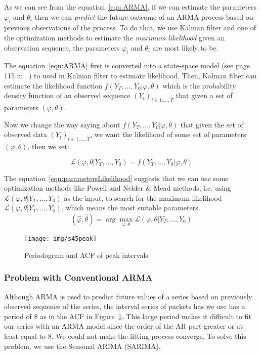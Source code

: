 \documentclass[12pt]{article}
\begin{document}
As we can see from the equation~\ref{eqn:ARMA}, if we can estimate the
parameters $\varphi_i$ and $\theta_i$ then we can \textit{predict} the future
outcome of an ARMA process based on previous observations of the process. To do
that, we use Kalman filter and one of the optimization methods to estimate the
\textit{maximum likelihood} given an observation sequence, the parameters
$\varphi_i$ and $\theta_i$ are most likely to be.

The equation~\ref{eqn:ARMA} first is converted into a state-space model (see
page 115 in~\cite{FalkStatSAS} ) to used in Kalman filter to estimate
likelihood. Then, Kalman filter can estimate the likelihood function
$f(Y_T,\ldots, Y_0|\varphi, \theta)$ which is the probability density
function of an observed sequence $(Y_t)_{t\in 1, \ldots, T}$ that given a set of
parameters $(\varphi, \theta)$.

Now we change the way saying about $f(Y_T,\ldots,Y_0|\varphi, \theta)$ that
given the set of observed data $(Y_t)_{t\in 1, \ldots, T}$, we want the likelihood of
some set of parameters $(\varphi, \theta)$, then we set:

\begin{equation}\label{eqn:parametersLikelihood}
\mathcal{L}(\varphi, \theta|Y_T,\ldots, Y_0) = f(Y_T,\ldots,Y_0|\varphi,
\theta)
\end{equation}

The equation~\ref{eqn:parametersLikelihood} suggests that we can use some
optimization methods like Powell and Nelder \& Mead methods, i.e. using
$\mathcal{L}(\varphi, \theta|Y_T,\ldots, Y_0)$ as the input, to search for the
maximum likelihood $\mathcal{L}(\varphi, \theta|Y_T,\ldots, Y_0)$, which means
the most suitable parameters.
\begin{equation}
(\hat{\varphi},\hat{\theta})=\arg\max_{\varphi, \theta} \mathcal{L}(\varphi,
\theta|Y_T,\ldots, Y_0)
\end{equation}

\begin{figure}[ht!]
\centering
\texttt{[image: img/s45peak]}
\caption{Periodogram and ACF of peak intervals}\label{fig:s45peak}
\end{figure}

\subsubsection{Problem with Conventional ARMA}
Although ARMA is used to predict future values of a series based on
previously observed sequence of the series, the interval series of packets has
we use has a period of 8 as in the ACF in Figure~\ref{fig:s45peak}. This large
period makes it difficult to fit our series with an ARMA model since the order of the AR
part greater or at least equal to 8. We could not make the fitting process
converge. To solve this problem, we use the Seasonal ARIMA (SARIMA).
\end{document}
